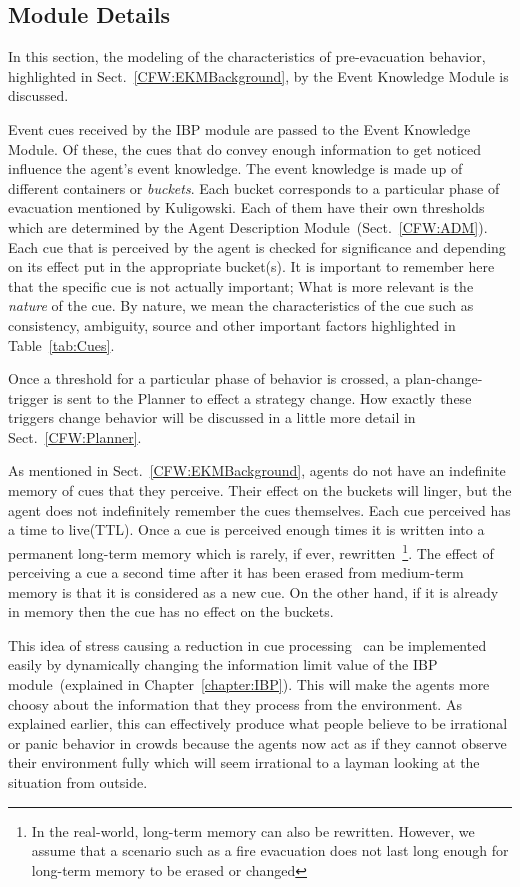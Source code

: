 \subsection{Module Details}
\label{CFW:EKMDetails}

In this section, the modeling of the characteristics of pre-evacuation behavior, highlighted in Sect.~\ref{CFW:EKMBackground}, by the Event Knowledge Module is discussed.

Event cues received by the IBP module are passed to the Event Knowledge Module. Of these, the cues that do convey enough information to get noticed influence the agent's event knowledge. The event knowledge is made up of different containers or \emph{buckets}. Each bucket corresponds to a particular phase of evacuation mentioned by Kuligowski. Each of them have their own thresholds which are determined by the Agent Description Module~(Sect.~\ref{CFW:ADM}). Each cue that is perceived by the agent is checked for significance and depending on its effect put in the appropriate bucket(s). It is important to remember here that the specific cue is not actually important; What is more relevant is the \emph{nature} of the cue. By nature, we mean the characteristics of the cue such as consistency, ambiguity, source and other important factors highlighted in Table~\ref{tab:Cues}.

Once a threshold for a particular phase of behavior is crossed, a plan-change-trigger is sent to the Planner to effect a strategy change. How exactly these triggers change behavior will be discussed in a little more detail in Sect.~\ref{CFW:Planner}.

As mentioned in Sect.~\ref{CFW:EKMBackground}, agents do not have an indefinite memory of cues that they perceive. Their effect on the buckets will linger, but the agent does not indefinitely remember the cues themselves. Each cue perceived has a time to live(TTL). Once a cue is perceived enough times it is written into a permanent long-term memory which is rarely, if ever, rewritten~\footnote{In the real-world, long-term memory can also be rewritten. However, we assume that a scenario such as a fire evacuation does not last long enough for long-term memory to be erased or changed}. The effect of perceiving a cue a second time after it has been erased from medium-term memory is that it is considered as a new cue. On the other hand, if it is already in memory then the cue has no effect on the buckets.

This idea of stress causing a reduction in cue processing~\cite{Ozel:2001tn} can be implemented easily by dynamically changing the information limit value of the IBP module~(explained in Chapter~\ref{chapter:IBP}). This will make the agents more choosy about the information that they process from the environment. As explained earlier, this can effectively produce what people believe to be irrational or panic behavior in crowds because the agents now act as if they cannot observe their environment fully which will seem irrational to a layman looking at the situation from outside.

